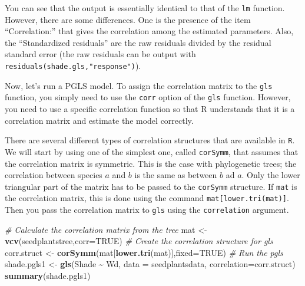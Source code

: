 \documentclass[
]{book}
\newenvironment{Shaded}{\begin{snugshade}}{\end{snugshade}}
\newcommand{\AttributeTok}[1]{\textcolor[rgb]{0.13,0.29,0.53}{#1}}
\newcommand{\CommentTok}[1]{\textcolor[rgb]{0.56,0.35,0.01}{\textit{#1}}}
\newcommand{\ConstantTok}[1]{\textcolor[rgb]{0.56,0.35,0.01}{#1}}
\newcommand{\FunctionTok}[1]{\textcolor[rgb]{0.13,0.29,0.53}{\textbf{#1}}}
\newcommand{\NormalTok}[1]{#1}
\newcommand{\OtherTok}[1]{\textcolor[rgb]{0.56,0.35,0.01}{#1}}
\newcommand{\SpecialCharTok}[1]{\textcolor[rgb]{0.81,0.36,0.00}{\textbf{#1}}}
\begin{document}
You can see that the output is essentially identical to that of the \texttt{lm} function. However, there are some differences. One is the presence of the item ``Correlation:'' that gives the correlation among the estimated parameters. Also, the ``Standardized residuals'' are the raw residuals divided by the residual standard error (the raw residuals can be output with \texttt{residuals(shade.gls,"response")}).

Now, let's run a PGLS model. To assign the correlation matrix to the \texttt{gls} function, you simply need to use the \texttt{corr} option of the \texttt{gls} function. However, you need to use a specific correlation function so that R understands that it is a correlation matrix and estimate the model correctly.

There are several different types of correlation structures that are available in \texttt{R}. We will start by using one of the simplest one, called \texttt{corSymm}, that assumes that the correlation matrix is symmetric. This is the case with phylogenetic trees; the correlation between species \(a\) and \(b\) is the same as between \(b\) ad \(a\). Only the lower triangular part of the matrix has to be passed to the \texttt{corSymm} structure. If \texttt{mat} is the correlation matrix, this is done using the command \texttt{mat{[}lower.tri(mat){]}}. Then you pass the correlation matrix to \texttt{gls} using the \texttt{correlation} argument.

\begin{Shaded}
\begin{Highlighting}[]
\CommentTok{\# Calculate the correlation matrix from the tree}
\NormalTok{mat }\OtherTok{\textless{}{-}} \FunctionTok{vcv}\NormalTok{(seedplantstree,}\AttributeTok{corr=}\ConstantTok{TRUE}\NormalTok{)}
\CommentTok{\# Create the correlation structure for gls}
\NormalTok{corr.struct }\OtherTok{\textless{}{-}} \FunctionTok{corSymm}\NormalTok{(mat[}\FunctionTok{lower.tri}\NormalTok{(mat)],}\AttributeTok{fixed=}\ConstantTok{TRUE}\NormalTok{)}
\CommentTok{\# Run the pgls}
\NormalTok{shade.pgls1 }\OtherTok{\textless{}{-}} \FunctionTok{gls}\NormalTok{(Shade }\SpecialCharTok{\textasciitilde{}}\NormalTok{ Wd, }\AttributeTok{data =}\NormalTok{ seedplantsdata, }\AttributeTok{correlation=}\NormalTok{corr.struct)}
\FunctionTok{summary}\NormalTok{(shade.pgls1)}
\end{Highlighting}
\end{Shaded}
\end{document}
